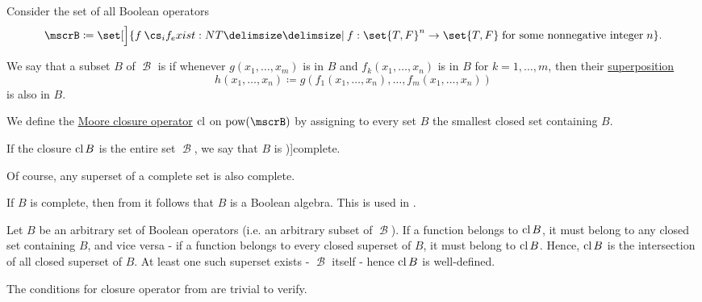 \begin{definition}\label{def:boolean_closure}
  Consider the set of all Boolean operators
  \begin{equation*}
    \mscrB \coloneqq \set[\Big]{ f \given* f: \set{ T, F }^n \to \set{ T, F } \T{for some nonnegative integer} n }.
  \end{equation*}

  \begin{thmenum}
     We say that a subset \( B \) of \( \mscrB \) is  if whenever \( g(x_1, \ldots, x_m) \) is in \( B \) and \( f_k(x_1, \ldots, x_n) \) is in \( B \) for \( k = 1, \ldots, m \), then their \hyperref[rem:function_superposition]{superposition}
    \begin{equation*}
      h(x_1, \ldots, x_n) \coloneqq g(f_1(x_1, \ldots, x_n), \ldots, f_m(x_1, \ldots, x_n))
    \end{equation*}
    is also in \( B \).

     We define the \hyperref[def:moore_closure_operator]{Moore closure operator} \( \operatorname{cl} \) on \( \pow(\mscrB) \) by assigning to every set \( B \) the smallest closed set containing \( B \).

     If the closure \( \operatorname{cl}{B} \) is the entire set \( \mscrB \), we say that \( B \) is \term[ru=полная система, en=complete basis (\cite[84]{Savage1998})]{complete}.
  \end{thmenum}
\end{definition}
\begin{comments}
  \item Of course, any superset of a complete set is also complete.
  \item If \( B \) is complete, then from  it follows that \( B \) is a Boolean algebra. This is used in .
\end{comments}
\begin{defproof}
  Let \( B \) be an arbitrary set of Boolean operators (i.e. an arbitrary subset of \( \mscrB \)). If a function belongs to \( \operatorname{cl}{B} \), it must belong to any closed set containing \( B \), and vice versa - if a function belongs to every closed superset of \( B \), it must belong to \( \operatorname{cl}{B} \). Hence, \( \operatorname{cl}{B} \) is the intersection of all closed superset of \( B \). At least one such superset exists - \( \mscrB \) itself - hence \( \operatorname{cl}{B} \) is well-defined.

  The conditions for closure operator from  are trivial to verify.
\end{defproof}

